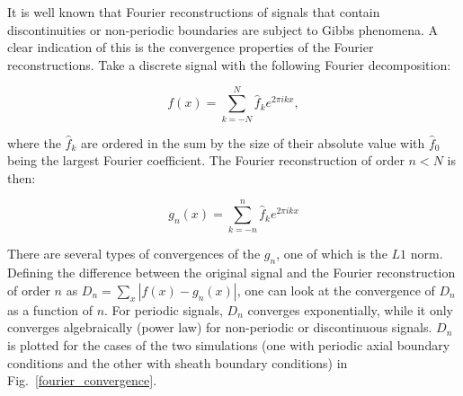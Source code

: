 \documentclass[showpacs,preprintnumbers,amsmath,amssymb,superscriptaddress,aip]{revtex4-1}
\def\beq{\begin{equation}}
\def\eeq{\end{equation}}
\begin{document}
It is well known that Fourier reconstructions of signals that contain discontinuities or non-periodic boundaries are subject to Gibbs phenomena. A clear indication of this is the
convergence properties of the Fourier reconstructions. Take a discrete signal with the following Fourier decomposition:

\beq
\label{f_decomp}
f(x) = \sum_{k=-N}^{N} \hat{f}_k e^{2 \pi i k x},
\eeq

where the $\hat{f}_k$ are ordered in the sum by the size of their absolute value with $\hat{f}_0$ being the largest Fourier coefficient. The Fourier reconstruction of order $n<N$ is then:

\beq
\label{f_recon}
g_n(x) = \sum_{k=-n}^{n} \hat{f}_k e^{2 \pi i k x}
\eeq

There are several types of convergences of the $g_n$, one of which is the $L1$ norm. Defining the difference between the original signal and the Fourier reconstruction of order $n$ as
$D_n = \sum_x |f(x) - g_n(x)|$, one can look at the convergence of $D_n$ as a function of $n$. For periodic signals, $D_n$ converges exponentially, while it only converges algebraically
(power law) for non-periodic or discontinuous signals. $D_n$ is plotted for the cases of the two simulations
(one with periodic axial boundary conditions and the other with sheath boundary conditions) in Fig.~\ref{fourier_convergence}.







\end{document}
